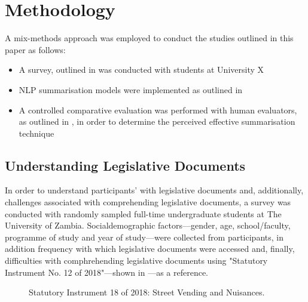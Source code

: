 \documentclass[conference]{IEEEtran}
\begin{document}
\section{Methodology}
\label{sec:methodology}
A mix-methods approach was employed to conduct the studies outlined in this paper as follows:
\begin{itemize}
    \item A survey, outlined in  was conducted with students at University X
    \item NLP summarisation models were implemented as outlined in 
    \item A controlled comparative evaluation was performed with human evaluators, as outlined in , in order to determine the perceived effective summarisation technique
\end{itemize}

\subsection{Understanding Legislative Documents}
\label{sec:methodology:understanding_legislation_documents}
In order to understand participants' with legislative documents and, additionally, challenges associated with comprehending legislative documents, a survey was conducted with randomly sampled full-time undergraduate students at The University of Zambia. Socialdemographic factors---gender, age, school/faculty, programme of study and year of study---were collected from participants, in addition frequency with which legislative documents were accessed and, finally, difficulties with comphrehending legislative documents using "Statutory Instrument No. 12 of 2018"---shown in ---as a reference.

\begin{figure}%
%
\caption{Statutory Instrument 18 of 2018: Street Vending and Nuisances.}
\label{fig:methodology:understanding_legislation_documents:si18_2018}
\end{figure}
\end{document}
